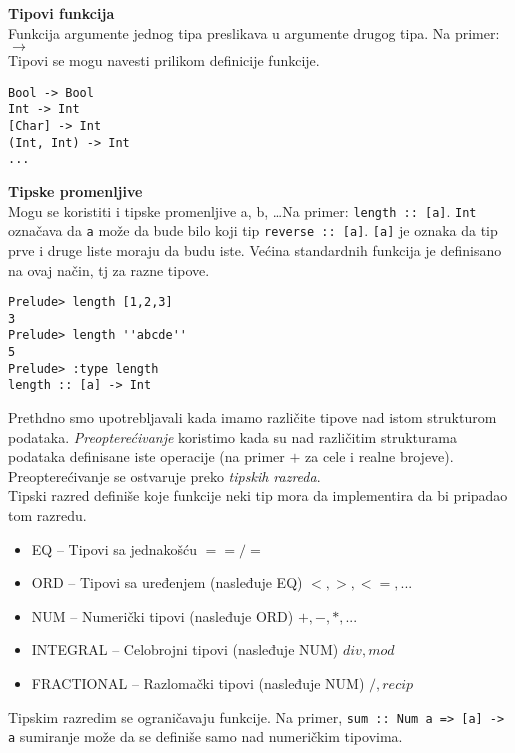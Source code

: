 \documentclass[../main.tex]{subfiles}
\begin{document}
\begin{multicols}{2}
{\bf Tipovi funkcija}\\
Funkcija argumente jednog tipa preslikava u argumente drugog tipa. Na primer: $\longrightarrow$
\\
Tipovi se mogu navesti prilikom definicije funkcije.
\columnbreak
\begin{boxprimer}[width=\linewidth/2]
\begin{Verbatim}
Bool -> Bool
Int -> Int
[Char] -> Int
(Int, Int) -> Int
...
\end{Verbatim}
\end{boxprimer}
\end{multicols}

\begin{multicols}{2}

{\bf Tipske promenljive}\\
Mogu se koristiti i tipske promenljive a, b, \ldots Na primer: \texttt{length :: [a]}. \texttt{Int} označava da \texttt{a} može da bude bilo koji tip \texttt{reverse :: [a]}. \texttt{[a]} je oznaka da tip prve i druge liste moraju da budu iste. Većina standardnih funkcija je definisano na ovaj način, tj za razne tipove.

\columnbreak
\begin{boxprimer}
\begin{Verbatim}
Prelude> length [1,2,3]
3
Prelude> length ''abcde''
5
Prelude> :type length
length :: [a] -> Int
\end{Verbatim}
\end{boxprimer}

\end{multicols}

Prethdno smo upotrebljavali kada imamo različite tipove nad istom strukturom podataka. {\it Preopterećivanje} koristimo kada su nad različitim strukturama podataka definisane iste operacije (na primer $+$ za cele i realne brojeve). Preopterećivanje se ostvaruje preko {\it tipskih razreda}. 
\\
Tipski razred definiše koje funkcije neki tip mora da implementira da bi pripadao tom razredu.
\begin{itemize}
\item EQ -- Tipovi sa jednakošću $==/=$
\item ORD -- Tipovi sa uređenjem (nasleđuje EQ) $<, >, <=, ...$
\item NUM -- Numerički tipovi (nasleđuje ORD) $+, -, *, ...$
\item INTEGRAL -- Celobrojni tipovi (nasleđuje NUM) $div, mod$
\item FRACTIONAL -- Razlomački tipovi (nasleđuje NUM) $/ , recip$
\end{itemize}
Tipskim razredim se ograničavaju funkcije. Na primer, \texttt{sum :: Num a => [a] -> a} sumiranje može da se definiše samo nad numeričkim tipovima. 
\end{document}
